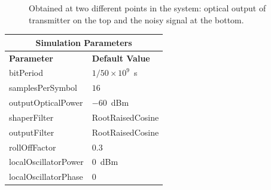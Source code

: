 \begin{refsection}
\begin{figure}[H]
\begin{minipage}{\linewidth}
	\caption{
		Obtained
		at two different points in the system: optical output of transmitter on the top and
		the noisy signal at the bottom.
		\label{fig:eyes_n_rrc_60_03}}
	\end{minipage}
\end{figure}
\begin{table}[H]
	\centering
	\footnotesize
	\begin{tabular}{|l|l|}
		\hline
		\multicolumn{2}{|c|}{ \textbf{Simulation Parameters} } \\
		\hline
		\textbf{Parameter}     & \textbf{Default Value}                                     \\\hline
		bitPeriod              & $1/50\times10^9$~s														\\\hline
		samplesPerSymbol       & $16$                                                       \\\hline
		outputOpticalPower     & $-60$~dBm 													\\ \hline
		shaperFilter	       & RootRaisedCosine												\\ \hline
		outputFilter		   & RootRaisedCosine												\\ \hline
		rollOffFactor		   & 0.3														\\ \hline
		localOscillatorPower   & $0$~dBm                                                    \\ \hline
		localOscillatorPhase   & $0$                                                        \\ \hline

\end{tabular}
\end{table}
\end{refsection}
